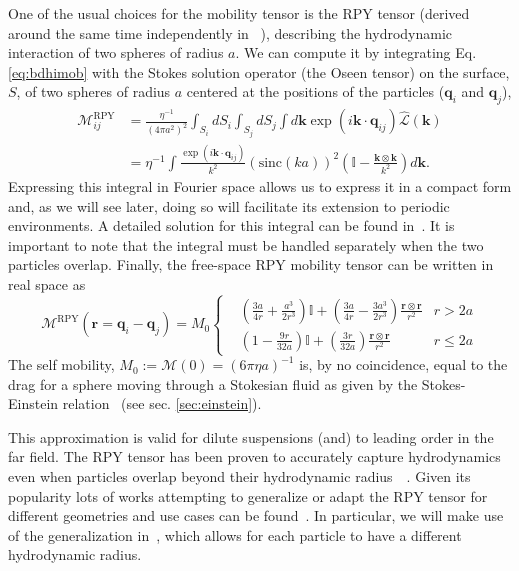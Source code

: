 \documentclass[twoside,openright,titlepage,numbers=noenddot,%
headinclude,footinclude,cleardoublepage=empty,abstract=on,
BCOR=5mm,fontsize=11pt, dvipsnames, paper=b5
]{scrreprt}
\renewcommand{\vec}[1]{\bm{#1}}
\newcommand{\tens}[1]{\bm{\mathcal{#1}}}
\newcommand{\oper}[1]{\mathcal{#1}}
\newcommand{\sinc}{\textrm{sinc}}
\newcommand{\ppos}{q}
\begin{document}
One of the usual choices for the mobility tensor is the \gls{RPY} tensor (derived around the same time independently in ~\cite{Rotne1969,Yamakawa1970}), describing the hydrodynamic interaction of two spheres of radius $a$. We can compute it by integrating Eq. \eqref{eq:bdhimob} with the Stokes solution operator (the Oseen tensor) on the surface, $S$, of two spheres of radius $a$ centered at the positions of the particles ($\vec{\ppos}_i$ and $\vec{\ppos}_j$),
\begin{equation}
  \label{eq:rpymobfour}
  \begin{aligned}
    \tens{M}_{ij}^{\textrm{RPY}} &= \frac{\eta^{-1}}{(4\pi a^2)^2} \int_{S_i}dS_i\int_{S_j}dS_j \int d\vec{k} \exp(i\vec{k}\cdot\vec{\ppos}_{ij})\hat{\oper{L}}(\vec{k})\\
    &= \eta^{-1} \int \frac{\exp(i\vec{k}\cdot\vec{\ppos}_{ij})}{k^2}\left(\sinc(ka) \right)^2\left(\mathbb{I} - \frac{\vec{k}\otimes\vec{k}}{k^2}\right)d\vec{k}.
\end{aligned}
\end{equation}
Expressing this integral in Fourier space allows us to express it in a compact form and, as we will see later, doing so will facilitate its extension to periodic environments.
A detailed solution for this integral can be found in~\cite{Wajnryb2013}. It is important to note that the integral must be handled separately when the two particles overlap.
Finally, the free-space \gls{RPY} mobility tensor can be written in real space as~\cite{Wajnryb2013}
\begin{equation}
  \label{eq:rpy}
  \tens{M}^{\textrm{RPY}}(\vec{r} = \vec{q}_i-\vec{q}_j) = M_0\left\{
  \begin{aligned}
    &\left( \frac{3a}{4r} + \frac{a^3}{2r^3} \right)\mathbb{I} + \left(\frac{3a}{4r} - \frac{3a^3}{2r^3}\right)\frac{\vec{r}\otimes\vec{r}}{r^2}  & r > 2a\\
    &\left(1 - \frac{9r}{32a} \right)\mathbb{I} + \left( \frac{3r}{32a} \right)\frac{\vec{r}\otimes\vec{r}}{r^2} & r \le 2a
  \end{aligned}\right.
\end{equation}
The self mobility, $M_0 := \tens{M}(0) = (6\pi\eta a)^{-1}$ is, by no coincidence, equal to the drag for a sphere moving through a Stokesian fluid as given by the Stokes-Einstein relation~\cite{Dhont1996} (see sec. \ref{sec:einstein}).

This approximation is valid for dilute suspensions (and) to leading order in the far field. The \gls{RPY} tensor has been proven to accurately capture hydrodynamics even when particles overlap beyond their hydrodynamic radius~\cite{Ermak1978}~\cite{Wajnryb2013}.
Given its popularity lots of works attempting to generalize or adapt the \gls{RPY} tensor for different geometries and use cases can be found~\cite{Wajnryb2013,Liang2013,Guan2018,Fiore2017}. In particular, we will make use of the generalization in~\cite{Zuk2014}, which allows for each particle to have a different hydrodynamic radius.
\end{document}
